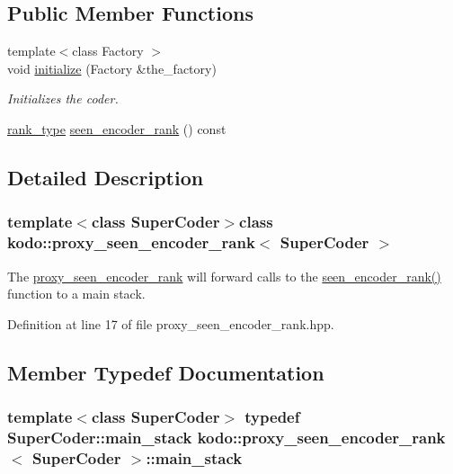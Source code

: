\subsection*{Public Member Functions}
\begin{DoxyCompactItemize}
\item 
{\footnotesize template$<$class Factory $>$ }\\void \hyperlink{classkodo_1_1proxy__seen__encoder__rank_a03b8f10f32254977e0dba8f8b1a29963}{initialize} (Factory \&the\-\_\-factory)
\begin{DoxyCompactList}\small\item\em Initializes the coder. \end{DoxyCompactList}\item 
\hyperlink{classkodo_1_1proxy__seen__encoder__rank_ae6f4968bbd129624143974c52dcf95cf}{rank\-\_\-type} \hyperlink{classkodo_1_1proxy__seen__encoder__rank_a7c7561fc6d6825fdba4137d044e959c2}{seen\-\_\-encoder\-\_\-rank} () const 
\begin{DoxyCompactList}\small\item\em \end{DoxyCompactList}\end{DoxyCompactItemize}


\subsection{Detailed Description}
\subsubsection*{template$<$class Super\-Coder$>$class kodo\-::proxy\-\_\-seen\-\_\-encoder\-\_\-rank$<$ Super\-Coder $>$}

The \hyperlink{classkodo_1_1proxy__seen__encoder__rank}{proxy\-\_\-seen\-\_\-encoder\-\_\-rank} will forward calls to the \hyperlink{classkodo_1_1proxy__seen__encoder__rank_a7c7561fc6d6825fdba4137d044e959c2}{seen\-\_\-encoder\-\_\-rank()} function to a main stack. 

Definition at line 17 of file proxy\-\_\-seen\-\_\-encoder\-\_\-rank.\-hpp.



\subsection{Member Typedef Documentation}
\hypertarget{classkodo_1_1proxy__seen__encoder__rank_a00472c10591ba80c147de689144bfd72}{
\subsubsection[{main\-\_\-stack}]{\setlength{\rightskip}{0pt plus 5cm}template$<$class Super\-Coder$>$ typedef Super\-Coder\-::main\-\_\-stack {\bf kodo\-::proxy\-\_\-seen\-\_\-encoder\-\_\-rank}$<$ Super\-Coder $>$\-::{\bf main\-\_\-stack}}}\label{classkodo_1_1proxy__seen__encoder__rank_a00472c10591ba80c147de689144bfd72}


